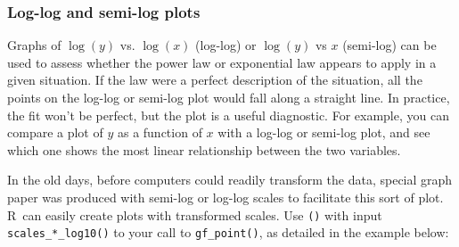 \documentclass[twoside]{book}\usepackage[]{graphicx}\usepackage[]{xcolor}
\newcommand{\Rindex}[1]{\index{\texttt{#1}}}
\newcommand{\function}[1]{{\color{purple!75!blue}\texttt{\StrSubstitute{#1}{()}{}()}}\Rindex{#1}}
\def\R{{\sf R}}
\newcounter{example}[section]
\begin{document}
\subsubsection{Log-log and semi-log plots}

Graphs of $\log(y)$ vs. $\log(x)$ (log-log) or $\log(y)$ vs $x$ (semi-log)
can be used to assess whether the power law or exponential law appears to apply
in a given situation.  If the law were a perfect description of the situation,
all the points on the log-log or semi-log plot would fall along a straight line.
In practice, the fit won't be perfect, but the plot is a useful diagnostic. 
For example, you can compare a plot of $y$ as a function of $x$ with a log-log or semi-log plot, 
and see which one shows the most linear relationship between the two variables.

In the old days, before computers could readily transform the data, special
graph paper was produced with semi-log or log-log scales to facilitate this
sort of plot.  
\R\ can easily create plots with transformed scales.  
Use \function{gf_refine()} with input \texttt{scales_*_log10()} to your call 
to \texttt{gf_point()}, as detailed in the example below:
\end{document}
